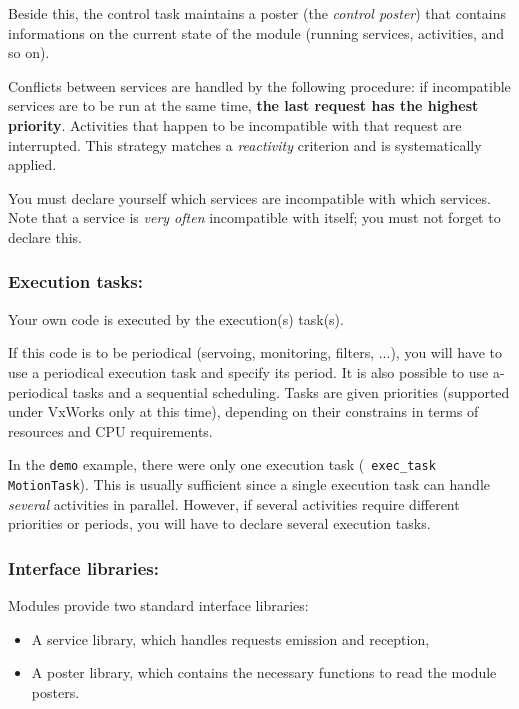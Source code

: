 Beside    this, the control task  maintains   a poster  (the {\em control
poster}) that contains informations on   the current state of the  module
(running services, activities, and so on).

Conflicts between services are   handled  by the following  procedure:  if
incompatible  services are to  be run  at the  same  time, {\bf  the last
request   has  the  highest  priority}. Activities    that  happen to  be
incompatible  with that request are  interrupted. This strategy matches a
{\em reactivity} criterion and is systematically applied.

You must  declare  yourself which  services  are incompatible with  which
services. Note that   a service is  {\em  very often}  incompatible  with
itself; you must not forget to declare this.


\subsubsection{Execution tasks:}

Your own code is executed by the execution(s) task(s).

If  this code is to  be periodical (servoing,  monitoring, filters, ...),
you will have to use a periodical  execution task and specify its period.
It   is  also  possible   to use   a-periodical  tasks  and  a  sequential
scheduling. Tasks are  given priorities (supported under VxWorks only
at this time),
depending on their constrains in terms of resources and CPU requirements.

In the  {\tt  demo} example,  there were  only one  execution  task ({\tt
exec\_task MotionTask}). This   is  usually  sufficient since  a   single
execution task can handle {\em several}  activities in parallel. However,
if several  activities require different  priorities or periods, you will
have to declare several execution tasks.


\subsubsection{Interface libraries:}

Modules provide two standard interface libraries:

\begin{itemize}
\item A service library, which handles requests emission and reception,
\item A poster library, which contains the necessary functions to read
the module posters.
\end{itemize}



